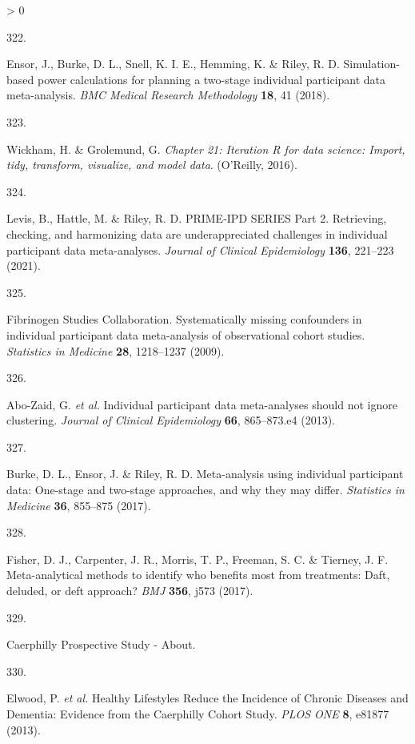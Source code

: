 \documentclass[a4paper, twoside]{templates/ociamthesis}
\newlength{\cslhangindent}
\newlength{\csllabelwidth}
\newenvironment{CSLReferences}[3] %
 {%
  \setlength{\parindent}{0pt}
  \ifodd #1 \everypar{\setlength{\hangindent}{\cslhangindent}}\ignorespaces\fi
  \ifnum #2 > 0
  \setlength{\parskip}{#2\baselineskip}
  \fi
 }%
 {}
\newcommand{\CSLLeftMargin}[1]{\parbox[t]{\maxof{\widthof{#1}}{\csllabelwidth}}{#1}}
\newcommand{\CSLRightInline}[1]{\parbox[t]{\linewidth - \csllabelwidth}{#1}}
\begin{document}
\begin{CSLReferences}{0}{0}
\leavevmode\hypertarget{ref-ensor2018}{}%
\CSLLeftMargin{322. }
\CSLRightInline{Ensor, J., Burke, D. L., Snell, K. I. E., Hemming, K. \& Riley, R. D. Simulation-based power calculations for planning a two-stage individual participant data meta-analysis. \emph{BMC Medical Research Methodology} \textbf{18}, 41 (2018).}

\leavevmode\hypertarget{ref-wickham2016func}{}%
\CSLLeftMargin{323. }
\CSLRightInline{Wickham, H. \& Grolemund, G. \emph{Chapter 21: Iteration \textbar{} {R} for data science: Import, tidy, transform, visualize, and model data}. ({O'Reilly}, 2016).}

\leavevmode\hypertarget{ref-levis2021}{}%
\CSLLeftMargin{324. }
\CSLRightInline{Levis, B., Hattle, M. \& Riley, R. D. {PRIME}-{IPD SERIES Part} 2. {Retrieving}, checking, and harmonizing data are underappreciated challenges in individual participant data meta-analyses. \emph{Journal of Clinical Epidemiology} \textbf{136}, 221--223 (2021).}

\leavevmode\hypertarget{ref-fibrinogenstudiescollaboration2009}{}%
\CSLLeftMargin{325. }
\CSLRightInline{Fibrinogen Studies Collaboration. Systematically missing confounders in individual participant data meta-analysis of observational cohort studies. \emph{Statistics in Medicine} \textbf{28}, 1218--1237 (2009).}

\leavevmode\hypertarget{ref-abo-zaid2013}{}%
\CSLLeftMargin{326. }
\CSLRightInline{Abo-Zaid, G. \emph{et al.} Individual participant data meta-analyses should not ignore clustering. \emph{Journal of Clinical Epidemiology} \textbf{66}, 865--873.e4 (2013).}

\leavevmode\hypertarget{ref-burke2017}{}%
\CSLLeftMargin{327. }
\CSLRightInline{Burke, D. L., Ensor, J. \& Riley, R. D. Meta-analysis using individual participant data: One-stage and two-stage approaches, and why they may differ. \emph{Statistics in Medicine} \textbf{36}, 855--875 (2017).}

\leavevmode\hypertarget{ref-fisher2017}{}%
\CSLLeftMargin{328. }
\CSLRightInline{Fisher, D. J., Carpenter, J. R., Morris, T. P., Freeman, S. C. \& Tierney, J. F. Meta-analytical methods to identify who benefits most from treatments: Daft, deluded, or deft approach? \emph{BMJ} \textbf{356}, j573 (2017).}

\leavevmode\hypertarget{ref-zotero-15398}{}%
\CSLLeftMargin{329. }
\CSLRightInline{Caerphilly {Prospective Study} - {About}.}

\leavevmode\hypertarget{ref-elwood2013}{}%
\CSLLeftMargin{330. }
\CSLRightInline{Elwood, P. \emph{et al.} Healthy {Lifestyles Reduce} the {Incidence} of {Chronic Diseases} and {Dementia}: Evidence from the {Caerphilly Cohort Study}. \emph{PLOS ONE} \textbf{8}, e81877 (2013).}


\end{CSLReferences}
\end{document}
